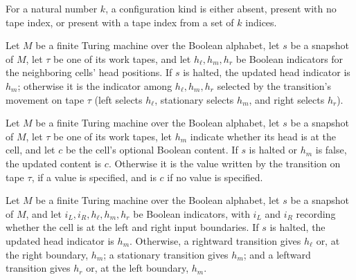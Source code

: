 \begin{definition}
\label{Complexity.CfgKind}
\leanok
For a natural number $k$, a configuration kind is either absent, present with no tape
index, or present with a tape index from a set of $k$ indices.
\end{definition}

\begin{definition}
\label{Complexity.cellHead}
\leanok
{}
Let $M$ be a finite Turing machine over the Boolean alphabet, let $s$ be a snapshot of
$M$, let $\tau$ be one of its work tapes, and let $h_\ell,h_m,h_r$ be Boolean indicators
for the neighboring cells’ head positions. If $s$ is halted, the updated head indicator
is $h_m$; otherwise it is the indicator among $h_\ell,h_m,h_r$ selected by the
transition’s movement on tape $\tau$ (left selects $h_\ell$, stationary selects $h_m$,
and right selects $h_r$).
\end{definition}

\begin{definition}
\label{Complexity.cellContent}
\leanok
{}
Let $M$ be a finite Turing machine over the Boolean alphabet, let $s$ be a snapshot of
$M$, let $\tau$ be one of its work tapes, let $h_m$ indicate whether its head is at the
cell, and let $c$ be the cell’s optional Boolean content. If $s$ is halted or $h_m$ is
false, the updated content is $c$. Otherwise it is the value written by the transition
on tape $\tau$, if a value is specified, and is $c$ if no value is specified.
\end{definition}

\begin{definition}
\label{Complexity.inHead}
\leanok
{}
Let $M$ be a finite Turing machine over the Boolean alphabet, let $s$ be a snapshot of
$M$, and let $i_L,i_R,h_\ell,h_m,h_r$ be Boolean indicators, with $i_L$ and $i_R$
recording whether the cell is at the left and right input boundaries. If $s$ is halted,
the updated head indicator is $h_m$. Otherwise, a rightward transition gives $h_\ell$
or, at the right boundary, $h_m$; a stationary transition gives $h_m$; and a leftward
transition gives $h_r$ or, at the left boundary, $h_m$.
\end{definition}

